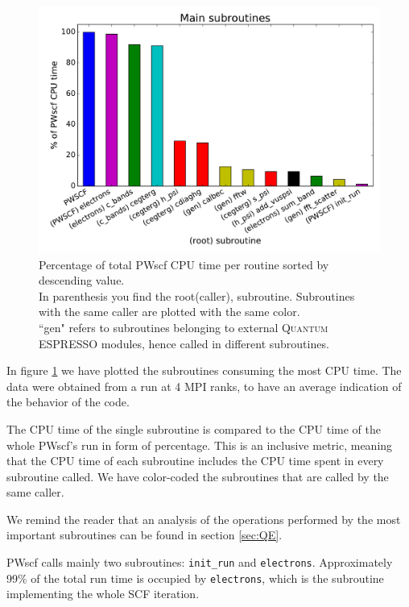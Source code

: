 \documentclass[a4paper,12pt]{article}
\newcommand\QE{\textsc{Quantum} ESPRESSO }
\begin{document}
\begin{figure}[hhh!]
\begin{center}
	\includegraphics[width=\linewidth]{main_subroutines.pdf}	
	\caption{Percentage of total PWscf CPU time per routine sorted by descending value. 
	\\In parenthesis you find the root(caller), subroutine. Subroutines with the same caller are plotted with the same color. 	
	\\``gen" refers to subroutines belonging to external \QE modules, hence called in different subroutines. }
	\label{fig:mainSubroutines}
\end{center}
\end{figure}

In figure \ref{fig:mainSubroutines} we have plotted the subroutines consuming the most CPU time. 
The data were obtained from a run at 4 MPI ranks, to have an average indication of the behavior of the code.

The CPU time of the single subroutine is compared to the CPU time of the whole PWscf's run in form of percentage.
This is an inclusive metric, meaning that the CPU time of each subroutine includes the CPU time spent in every subroutine called.
We have color-coded the subroutines that are called by the same caller.

We remind the reader that an analysis of the operations performed by the most important subroutines can be found in section \ref{sec:QE}.


PWscf calls mainly two subroutines: \texttt{init\_run} and \texttt{electrons}.
Approximately 99\% of the total run time is occupied by \texttt{electrons}, which is the subroutine implementing the whole SCF iteration.
\end{document}
